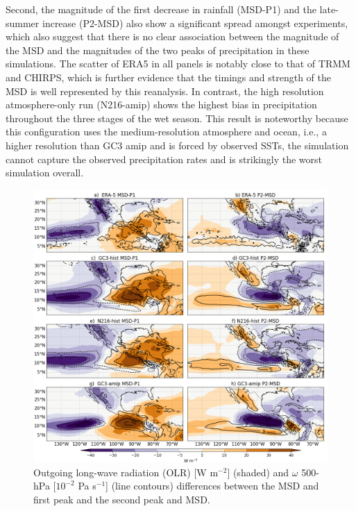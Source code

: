  
Second, the magnitude of the first decrease in rainfall (MSD-P1) and the late-summer increase (P2-MSD) also show a significant spread amongst experiments, which also suggest that there is no clear association between the magnitude of the MSD and the magnitudes of the two peaks of precipitation in these simulations. The scatter of ERA5 in all panels is notably close to that of TRMM and CHIRPS, which is further evidence that the timings and strength of the MSD is well represented by this reanalysis. In contrast, the high resolution atmosphere-only run (N216-amip) shows the highest bias in precipitation throughout the three stages of the wet season. This result is noteworthy because this configuration uses the medium-resolution atmosphere and ocean, i.e., a higher resolution than GC3 amip and is forced by observed SSTs, the simulation cannot capture the observed precipitation rates and is strikingly the worst simulation overall. %


 \begin{figure}[t!]
\includegraphics[width=\linewidth]{figures/fig4_olrv_3.png}
\caption[OLR and vertical velocity composites]{Outgoing long-wave radiation (OLR) [W m$^{-2}$] (shaded) and $\omega$ 500-hPa [$10^{-2}$ Pa s$^{-1}$] (line contours) differences between the MSD and first peak and the second peak and MSD.}
\label{fig:olranom}
\end{figure}

